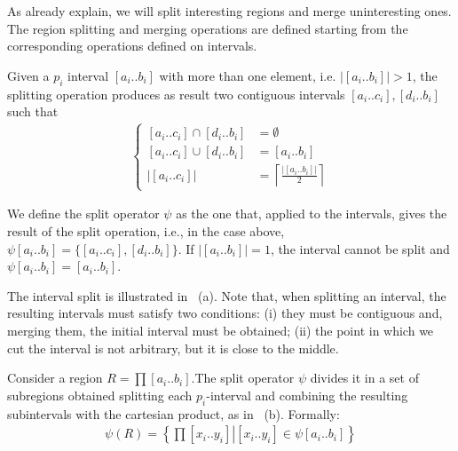 As already explain, we will split interesting regions and merge uninteresting ones. The region splitting and merging operations are defined starting from the corresponding operations defined on intervals.
\begin{definition}
Given a $p_i$ interval $\left[a_{i}..b_{i}\right]$ with more than one element, i.e. $\left|\left[a_{i}..b_{i}\right]\right|>1$, the splitting operation produces as result two contiguous intervals $\left[a_{i}..c_{i}\right],\left[d_{i}..b_{i}\right]$
 such that
	\begin{align}
		\begin{cases}
		\left[a_{i}..c_{i}\right]\cap\left[d_{i}..b_{i}\right] & =\emptyset\\
		\left[a_{i}..c_{i}\right]\cup\left[d_{i}..b_{i}\right] & =\left[a_{i}..b_{i}\right]\\
		\left|\left[a_{i}..c_{i}\right]\right| & =\left\lceil \frac{\left|\left[a_{i}..b_{i}\right]\right|}{2}\right\rceil 
		\end{cases}
	\end{align}

We define the split operator $\psi$ as the one that, applied to the intervals, gives the result of the split operation, i.e., in the case above, $\psi \left[a_{i}..b_{i}\right]=\lbrace \left[a_{i}..c_{i}\right],\left[d_{i}..b_{i}\right] \rbrace$.
If $\left|\left[a_{i}..b_{i}\right]\right|=1$, the interval
cannot be split and $\psi \left[a_{i}..b_{i}\right]=\left[a_{i}..b_{i}\right]$.
\end{definition}

The interval split is illustrated in ~(a). Note that, when splitting an interval, the resulting intervals must satisfy two conditions: (i) they must be contiguous and, merging them, the initial interval must be obtained; (ii) the point in which we cut the interval is not arbitrary, but it is close to the middle.

\begin{definition}
\label{pers02.def:Splitting-a-region}
Consider a region $R=\prod\left[a_{i}..b_{i}\right]$.The split operator $\psi$ divides it in a set of subregions obtained splitting each $p_i$-interval and combining the resulting subintervals with the cartesian product, as in ~(b). Formally:
	\begin{align}
		\psi(R) = \left\{ \left.\prod\left[x_{i}..y_{i}\right]\right|\left[x_{i}..y_{i}\right]\in \psi\left[a_{i}..b_{i}\right]  \right\} 
	\end{align}

\end{definition}


